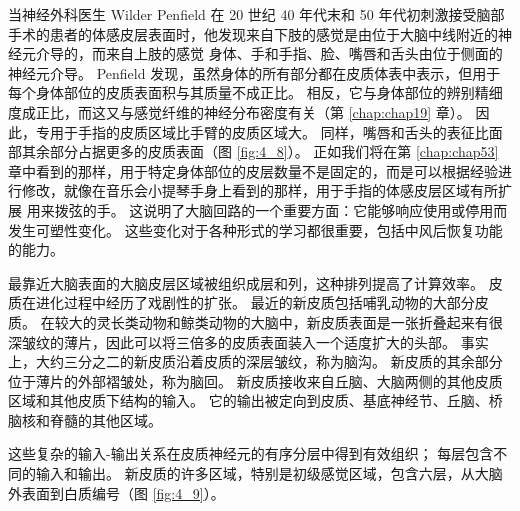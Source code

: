 当神经外科医生 Wilder Penfield 在 20 世纪 40 年代末和 50 年代初刺激接受脑部手术的患者的体感皮层表面时，他发现来自下肢的感觉是由位于大脑中线附近的神经元介导的，而来自上肢的感觉 身体、手和手指、脸、嘴唇和舌头由位于侧面的神经元介导。 
Penfield 发现，虽然身体的所有部分都在皮质体表中表示，但用于每个身体部位的皮质表面积与其质量不成正比。 
相反，它与身体部位的辨别精细度成正比，而这又与感觉纤维的神经分布密度有关（第 \ref{chap:chap19} 章）。 
因此，专用于手指的皮质区域比手臂的皮质区域大。 
同样，嘴唇和舌头的表征比面部其余部分占据更多的皮质表面（图 \ref{fig:4_8}）。 
正如我们将在第 \ref{chap:chap53} 章中看到的那样，用于特定身体部位的皮层数量不是固定的，而是可以根据经验进行修改，就像在音乐会小提琴手身上看到的那样，用于手指的体感皮层区域有所扩展 用来拨弦的手。 
这说明了大脑回路的一个重要方面：它能够响应使用或停用而发生可塑性变化。 
这些变化对于各种形式的学习都很重要，包括中风后恢复功能的能力。


最靠近大脑表面的大脑皮层区域被组织成层和列，这种排列提高了计算效率。 
皮质在进化过程中经历了戏剧性的扩张。 
最近的新皮质包括哺乳动物的大部分皮质。 
在较大的灵长类动物和鲸类动物的大脑中，新皮质表面是一张折叠起来有很深皱纹的薄片，因此可以将三倍多的皮质表面装入一个适度扩大的头部。 
事实上，大约三分之二的新皮质沿着皮质的深层皱纹，称为脑沟。 
新皮质的其余部分位于薄片的外部褶皱处，称为脑回。 
新皮质接收来自丘脑、大脑两侧的其他皮质区域和其他皮质下结构的输入。 
它的输出被定向到皮质、基底神经节、丘脑、桥脑核和脊髓的其他区域。


这些复杂的输入-输出关系在皮质神经元的有序分层中得到有效组织； 每层包含不同的输入和输出。 
新皮质的许多区域，特别是初级感觉区域，包含六层，从大脑外表面到白质编号（图 \ref{fig:4_9}）。

